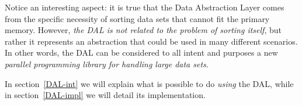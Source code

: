 Notice an interesting aspect: it is true that the Data Abstraction Layer comes from the specific necessity of sorting data sets that cannot fit the primary memory. However, \textit{the DAL is not related to the problem of sorting itself}, but rather it represents an abstraction that could be used in many different scenarios. In other words, the DAL can be considered to all intent and purposes a new \textit{parallel programming library for handling large data sets}. 


In section~\ref{DAL-int} we will explain what is possible to do \textit{using} the DAL, while in section~\ref{DAL-impl} we will detail its implementation. 

